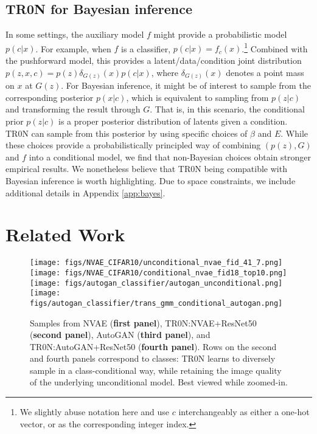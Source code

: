 \documentclass[nohyperref]{article}
\theoremstyle{plain}
\theoremstyle{definition}
\theoremstyle{remark}
\begin{document}
\subsection{TR0N for Bayesian inference}\label{sec:bayes}

In some settings, the auxiliary model $f$ might provide a probabilistic model $p(c|x)$. For example, when $f$ is a classifier, $p(c|x)=f_c(x)$.\footnote{We slightly abuse notation here and use $c$ interchangeably as either a one-hot vector, or as the corresponding integer index.}  Combined with the pushforward model, this provides a latent/data/condition joint distribution $p(z,x,c)=p(z)\delta_{G(z)}(x)p(c|x)$, where $\delta_{G(z)}(x)$ denotes a point mass on $x$ at $G(z)$. For Bayesian inference, it might be of interest to sample from the corresponding posterior $p(x|c)$, which is equivalent to sampling from $p(z|c)$ and transforming the result through $G$. That is, in this scenario, the conditional prior $p(z|c)$ is a proper posterior distribution of latents given a condition. TR0N can sample from this posterior by using specific choices of $\beta$ and $E$. While these choices provide a probabilistically principled way of combining $(p(z), G)$ and $f$ into a conditional model, we find that non-Bayesian choices obtain stronger empirical results. We nonetheless believe that TR0N being compatible with Bayesian inference is worth highlighting. Due to space constraints, we include additional details in Appendix \ref{app:bayes}.

%
 
\section{Related Work}
\begin{figure*}[t!]
    \centering
    \texttt{[image: figs/NVAE\_CIFAR10/unconditional\_nvae\_fid\_41\_7.png]} \hspace{0.05cm}
    \texttt{[image: figs/NVAE\_CIFAR10/conditional\_nvae\_fid18\_top10.png]}
    \hspace{0.05cm}
    \texttt{[image: figs/autogan\_classifier/autogan\_unconditional.png]}
    \hspace{0.05cm}
    \texttt{[image: figs/autogan\_classifier/trans\_gmm\_conditional\_autogan.png]}
    \caption{Samples from NVAE (\textbf{first panel}), TR0N:NVAE+ResNet50 (\textbf{second panel}), AutoGAN (\textbf{third panel}), and TR0N:AutoGAN+ResNet50 (\textbf{fourth panel}). Rows on the second and fourth panels correspond to classes: TR0N  learns to diversely sample in a class-conditional way, while retaining the image quality of the underlying unconditional model. Best viewed while zoomed-in.}
    \label{fig:cifar_conditioning}
\end{figure*}
\end{document}
